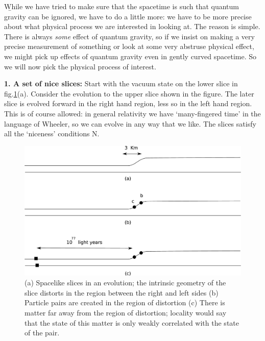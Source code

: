 \documentclass[12pt]{article}
\begin{document}
\b

While we have tried to make sure that the spacetime is such that  quantum gravity can be ignored, we have to do a little more:  we have to be more precise about what physical process we are interested in looking at. The reason is simple. There is always {\it some} effect of quantum gravity, so if we insist on making a very precise measurement of something or look at some very abstruse physical effect, we might pick up effects of quantum gravity even in gently curved spacetime. So we will now pick the physical process of interest.

\bigskip

{\bf 1.  A set of nice slices:}  Start with the vacuum state on the lower slice in fig.\ref{fone}(a). Consider the evolution to the upper slice shown in the figure.  The later slice is evolved forward in the right hand region, less so in the left hand region. This is of course allowed: in general relativity we have `many-fingered time' in the language of Wheeler, so we can evolve in any way that we like. The slices satisfy all the `niceness' conditions N. 

\begin{figure}[htbp]
\begin{center}
\includegraphics[scale=.15]{fone.eps}
\caption{(a) Spacelike slices in an evolution; the intrinsic geometry of the slice distorts in the region between the right and left sides (b) Particle pairs are created in the region of distortion (c) There is matter far away from the region of distortion; locality would say that the state of this matter is only weakly correlated with the state of the pair.}
\label{fone}
\end{center}
\end{figure}
\end{document}
